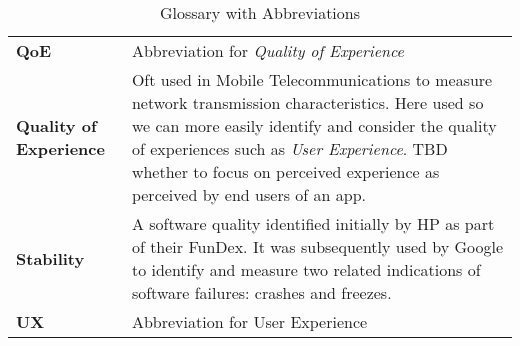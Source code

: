 \begin{table}
{\begin{tabular}{@{}>{\bfseries}p{5.3cm}p{9.2cm}@{}}
QoE & Abbreviation for \emph{Quality of Experience} \\

Quality of Experience & Oft used in Mobile Telecommunications to measure network transmission characteristics. Here used so we can more easily identify and consider the quality of experiences such as \emph{User Experience}. TBD whether to focus on perceived experience as perceived by end users of an app.\\

Stability &A software quality identified initially by HP as part of their FunDex. It was subsequently used by Google to identify and measure two related indications of software failures: crashes and freezes. \\ %

UX & Abbreviation for User Experience \\
\end{tabular}}
\caption{Glossary with Abbreviations}
\end{table}


\clearpage